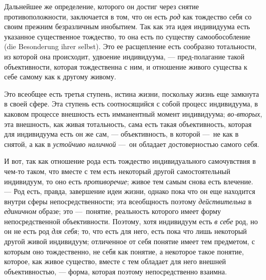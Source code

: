 \documentclass[twoside]{article}
\begin{document}
{{{Дальнейшее же определение, которого он достиг через снятие
противоположности, заключается в том, что он есть
{\em род} как тождество
себя со своим прежним безразличным инобытием. Так как эта
идея индивидуума есть указанное существенное тождество, то она есть по
существу самообособление (die Besonderung ihrer selbst). Это
ее расщепление есть сообразно тотальности, из которой она происходит,
удвоение индивидуума, — пред-полагание такой объективности,
которая тождественна с ним, и отношение живого существа к себе самому как к
другому живому.

Это всеобщее есть третья ступень, истина жизни, поскольку
жизнь еще замкнута в своей сфере. Эта ступень есть соотносящийся с собой
процесс индивидуума, в каковом процессе внешность есть имманентный момент
индивидуума; {\em во-вторых},
эта внешность, как живая тотальность, сама есть такая
объективность, которая для индивидуума есть он же сам, —
объективность, в которой —~не как в снятой, а
как в {\em устойчиво наличной}
—~он обладает достоверностью самого себя.

И вот, так как отношение рода есть тождество индивидуального
самочувствия в чем-то таком, что вместе с тем есть некоторый другой
самостоятельный индивидуум, то оно есть
{\em противоречие}; живое
тем самым снова есть влечение. — Род есть, правда,
завершение идеи жизни, однако пока что он еще находится внутри сферы
непосредственности; эта всеобщность поэтому
{\em действительна} в
{\em единичном} образе;
это —~понятие, реальность которого имеет форму
непосредственной объективности. Поэтому, хотя индивидуум есть
{\em в себе} род, но он
не есть род {\em для себя};
то, что есть для него, есть пока что лишь некоторый другой
живой индивидуум; отличенное от себя понятие имеет тем предметом, с которым
оно тождественно, не себя как понятие, а некоторое такое понятие, которое,
как живое существо, вместе с тем обладает для него внешней объективностью,
— форма, которая поэтому непосредственно взаимна.

}}}
\end{document}
